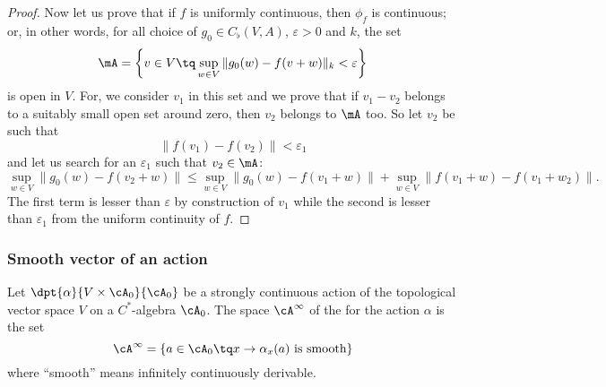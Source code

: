 \begin{proof}
	Now let us prove that if $f$ is uniformly continuous, then $\phi_f$ is continuous; or, in other words, for all choice of $g_0\in C_{\flat}(V,A)$, $\varepsilon>0$ and $k$, the set
	\begin{equation}
		\mA=\left\{ v\in V\tq \sup_{w\in V}\| g_0(w)-f(v+w) \|_k<\varepsilon \right\}
	\end{equation}
	is open in $V$. For, we consider $v_1$ in this set and we prove that if $v_1-v_2$ belongs to a suitably small open set around zero, then $v_2$ belongs to $\mA$ too. So let $v_2$ be such that
	\[
		\| f(v_1)-f(v_2) \|<\varepsilon_1
	\]
	and let us search for an $\varepsilon_1$ such that $v_2\in\mA$:
	\begin{equation}
		\sup_{w\in V}\| g_0(w)-f(v_2+w) \|\leq \sup_{w\in V}\| g_0(w)-f(v_1+w) \|+\sup_{w\in V}\| f(v_1+w)-f(v_1+w_2) \|.
	\end{equation}
	The first term is lesser than $\varepsilon$ by construction of $v_1$ while the second is lesser than $\varepsilon_1$ from the uniform continuity of $f$.

\end{proof}

\subsubsection{Smooth vector of an action}

Let $\dpt{\alpha}{V\times\cA_0}{\cA_0}$ be a strongly continuous action of the topological vector space $V$ on a $C^*$-algebra $\cA_0$. The space $\cA^{\infty}$ of the  for the action $\alpha$ is the set
\begin{equation}
	\cA^{\infty}=\{ a\in\cA_0\tq x\to\alpha_x(a)\textrm{ is smooth} \}
\end{equation}
where ``smooth'' means infinitely continuously derivable.

